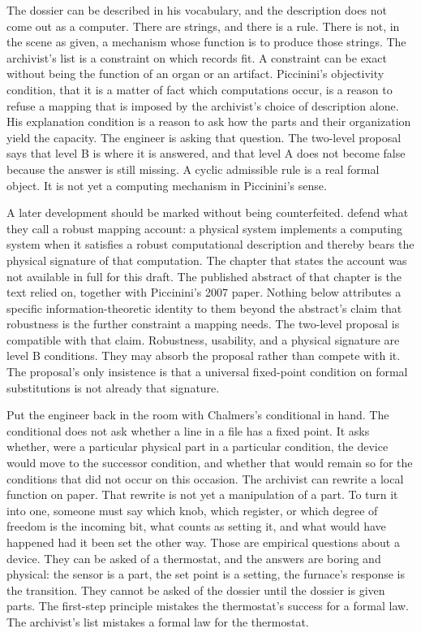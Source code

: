 \documentclass[11pt]{article}
\begin{document}
The dossier can be described in his vocabulary, and the description does not come out as a computer. There are strings, and there is a rule. There is not, in the scene as given, a mechanism whose function is to produce those strings. The archivist’s list is a constraint on which records fit. A constraint can be exact without being the function of an organ or an artifact. Piccinini’s objectivity condition, that it is a matter of fact which computations occur, is a reason to refuse a mapping that is imposed by the archivist’s choice of description alone. His explanation condition is a reason to ask how the parts and their organization yield the capacity. The engineer is asking that question. The two-level proposal says that level B is where it is answered, and that level A does not become false because the answer is still missing. A cyclic admissible rule is a real formal object. It is not yet a computing mechanism in Piccinini’s sense.

A later development should be marked without being counterfeited. \citet{anderson2024} defend what they call a robust mapping account: a physical system implements a computing system when it satisfies a robust computational description and thereby bears the physical signature of that computation. The chapter that states the account was not available in full for this draft. The published abstract of that chapter is the text relied on, together with Piccinini’s 2007 paper. Nothing below attributes a specific information-theoretic identity to them beyond the abstract’s claim that robustness is the further constraint a mapping needs. The two-level proposal is compatible with that claim. Robustness, usability, and a physical signature are level B conditions. They may absorb the proposal rather than compete with it. The proposal’s only insistence is that a universal fixed-point condition on formal substitutions is not already that signature.

Put the engineer back in the room with Chalmers’s conditional in hand. The conditional does not ask whether a line in a file has a fixed point. It asks whether, were a particular physical part in a particular condition, the device would move to the successor condition, and whether that would remain so for the conditions that did not occur on this occasion. The archivist can rewrite a local function on paper. That rewrite is not yet a manipulation of a part. To turn it into one, someone must say which knob, which register, or which degree of freedom is the incoming bit, what counts as setting it, and what would have happened had it been set the other way. Those are empirical questions about a device. They can be asked of a thermostat, and the answers are boring and physical: the sensor is a part, the set point is a setting, the furnace’s response is the transition. They cannot be asked of the dossier until the dossier is given parts. The first-step principle mistakes the thermostat’s success for a formal law. The archivist’s list mistakes a formal law for the thermostat.
\end{document}
